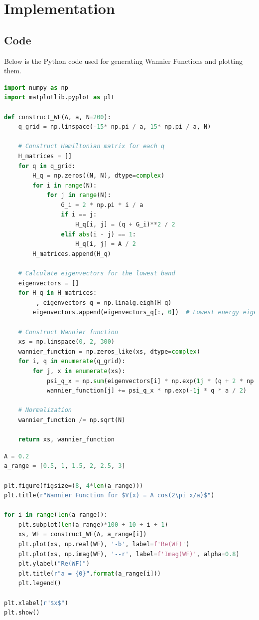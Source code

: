 \documentclass[12pt,a4paper]{article}
\begin{document}

\section{Implementation}
\subsection{Code}

Below is the Python code used for generating Wannier Functions and plotting them.

\begin{lstlisting}[language=Python, caption=Functions for the construction and generation of WFs]
import numpy as np
import matplotlib.pyplot as plt

def construct_WF(A, a, N=200):
    q_grid = np.linspace(-15* np.pi / a, 15* np.pi / a, N)

    # Construct Hamiltonian matrix for each q
    H_matrices = []
    for q in q_grid:
        H_q = np.zeros((N, N), dtype=complex)
        for i in range(N):
            for j in range(N):
                G_i = 2 * np.pi * i / a
                if i == j:
                    H_q[i, j] = (q + G_i)**2 / 2
                elif abs(i - j) == 1:
                    H_q[i, j] = A / 2
        H_matrices.append(H_q)

    # Calculate eigenvectors for the lowest band
    eigenvectors = []
    for H_q in H_matrices:
        _, eigenvectors_q = np.linalg.eigh(H_q)
        eigenvectors.append(eigenvectors_q[:, 0])  # Lowest energy eigenvector

    # Construct Wannier function
    xs = np.linspace(0, 2, 300)
    wannier_function = np.zeros_like(xs, dtype=complex)
    for i, q in enumerate(q_grid):
        for j, x in enumerate(xs):
            psi_q_x = np.sum(eigenvectors[i] * np.exp(1j * (q + 2 * np.pi * np.arange(N) / a) * x))
            wannier_function[j] += psi_q_x * np.exp(-1j * q * a / 2)

    # Normalization
    wannier_function /= np.sqrt(N)

    return xs, wannier_function
\end{lstlisting}

\begin{lstlisting}[language=Python, caption=Plotting WFs for different values of a]
A = 0.2
a_range = [0.5, 1, 1.5, 2, 2.5, 3]

plt.figure(figsize=(8, 4*len(a_range)))
plt.title(r"Wannier Function for $V(x) = A cos(2\pi x/a)$")

for i in range(len(a_range)):
    plt.subplot(len(a_range)*100 + 10 + i + 1)
    xs, WF = construct_WF(A, a_range[i])
    plt.plot(xs, np.real(WF), '-b', label=f'Re(WF)')
    plt.plot(xs, np.imag(WF), '--r', label=f'Imag(WF)', alpha=0.8)
    plt.ylabel("Re(WF)")
    plt.title(r"a = {0}".format(a_range[i]))
    plt.legend()

plt.xlabel(r"$x$")
plt.show()
\end{lstlisting}
\end{document}
